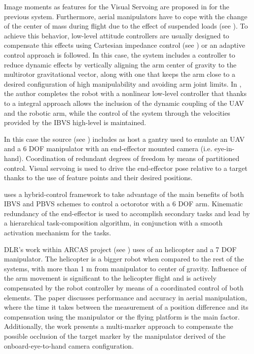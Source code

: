  
Image moments as features for the Visual Servoing are proposed in \cite{mebarki_exploiting_2013} for the previous system. Furthermore, aerial manipulators have to cope with the change of the center of mass during flight due to the effect of suspended loads (see \cite{palunko_2012}). To achieve this behavior, low-level attitude controllers are usually designed to compensate this effects using Cartesian impedance control (see \cite{lippiello_impedance_2012}) or an adaptive control approach is followed. In this case, the system includes a controller to reduce dynamic effects by vertically aligning the arm center of gravity to the multirotor gravitational vector, along with one that keeps the arm close to a desired configuration of high manipulability and avoiding arm joint limits. In \cite{mebarki_cross-coupled_2014}, the author completes the robot with a nonlinear low-level controller that thanks to a integral  approach allows the inclusion of the dynamic coupling of the UAV and the robotic arm, while the control of the system through the velocities provided by the IBVS high-level is maintained.
 

In this case the source (see \cite{danko_evaluation_2014}) includes as host a gantry used to emulate an UAV and a 6 DOF manipulator with an end-effector mounted camera (i.e. eye-in-hand). Coordination of redundant degrees of freedom by means of partitioned control. Visual servoing is used to drive the end-effector pose relative to a target thanks to the use of feature points and their desired positions.


\cite{lippiello_hybrid_2016} uses a hybrid-control framework to take advantage of the main benefits of both IBVS and PBVS schemes to control a octorotor with a 6 DOF arm. Kinematic redundancy of the end-effector is used to accomplish secondary tasks and lead by a hierarchical task-composition algorithm, in conjunction with a smooth activation mechanism for the tasks.



DLR's work within ARCAS project (see \cite{laiacker_high_2016}) uses of an helicopter and a 7 DOF manipulator. The helicopter is a bigger robot when compared to the rest of the systems, with more than 1 m from manipulator to center of gravity. Influence of the arm movement is significant to the helicopter flight and is actively compensated by the robot controller by means of a coordinated control of both elements. The paper discusses performance and accuracy in aerial manipulation, where the time it takes between the measurement of a position difference and its compensation using the manipulator or the flying platform is the main factor. Additionally, the work presents a multi-marker approach to compensate the possible occlusion of the target marker by the manipulator derived of the onboard-eye-to-hand camera configuration.


